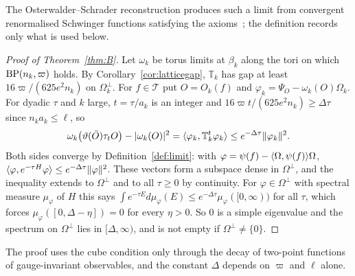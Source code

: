The Osterwalder--Schrader reconstruction produces such a limit from
convergent renormalised Schwinger functions satisfying the
axioms~\cite{OS73,OS75}; the definition records only what is used below.

\begin{proof}[Proof of Theorem~\ref{thm:B}]
Let $\omega_k$ be torus limits at $\beta_k$ along the tori on which
$\mathrm{BP}(n_k,\varpi)$ holds. By Corollary~\ref{cor:latticegap}, $\mathbb T_k$ has gap
at least $16\varpi/(625e^2n_k)$ on $\Omega_k^\perp$. For $f\in\mathcal T$ put
$O=O_k(f)$ and $\varphi_k=\Psi_O-\omega_k(O)\Omega_k$. For dyadic $\tau$ and $k$
large, $t=\tau/a_k$ is an integer and $16\varpi t/(625e^2n_k)\ge\Delta\tau$ since
$n_ka_k\le\ell$, so
\[
\omega_k\bigl(\vartheta(\bar O)\tau_tO\bigr)-|\omega_k(O)|^2=\langle \varphi_k,\mathbb T_k^t
\varphi_k\rangle\le e^{-\Delta\tau}\|\varphi_k\|^2 .
\]
Both sides converge by Definition~\ref{def:limit}: with $\varphi=\psi(f)-\langle \Omega,\psi(f)\rangle\Omega$, $\langle \varphi,e^{-\tau H}\varphi\rangle\le e^{-\Delta\tau}\|\varphi\|^2$. These
vectors form a subspace dense in $\Omega^\perp$, and the inequality extends to
$\Omega^\perp$ and to all $\tau\ge0$ by continuity. For $\varphi\in\Omega^\perp$ with
spectral measure $\mu_\varphi$ of $H$ this says $\int e^{-\tau E}d\mu_\varphi(E)\le e^{-\Delta
\tau}\mu_\varphi([0,\infty))$ for all $\tau$, which forces $\mu_\varphi([0,\Delta-\eta])=0$
for every $\eta>0$. So $0$ is a simple eigenvalue and the spectrum on
$\Omega^\perp$ lies in $[\Delta,\infty)$, and is not empty if $\Omega^\perp\ne\{0\}$.
\end{proof}

The proof uses the cube condition only through the decay of two-point
functions of gauge-invariant observables, and the constant $\Delta$ depends on
$\varpi$ and $\ell$ alone.
